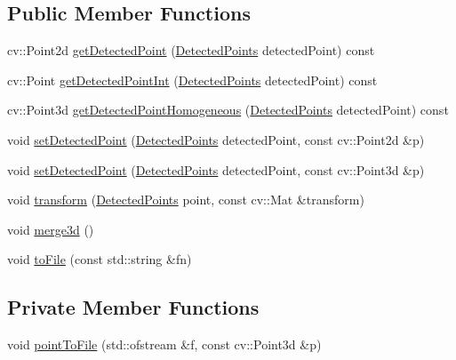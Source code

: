 \subsection*{Public Member Functions}
\begin{DoxyCompactItemize}
\item 
cv\+::\+Point2d \hyperlink{class_face3_d_1_1_face_geometry_a9ce57cf061663a02267d9fee423dbc73}{get\+Detected\+Point} (\hyperlink{class_face3_d_1_1_face_geometry_aab597f00966010882927a4974649bf11}{Detected\+Points} detected\+Point) const 
\item 
cv\+::\+Point \hyperlink{class_face3_d_1_1_face_geometry_a3c4e46361330951648193f24b8a5329d}{get\+Detected\+Point\+Int} (\hyperlink{class_face3_d_1_1_face_geometry_aab597f00966010882927a4974649bf11}{Detected\+Points} detected\+Point) const 
\item 
cv\+::\+Point3d \hyperlink{class_face3_d_1_1_face_geometry_a6aed421ae667cc1b67b4bf6a891ff634}{get\+Detected\+Point\+Homogeneous} (\hyperlink{class_face3_d_1_1_face_geometry_aab597f00966010882927a4974649bf11}{Detected\+Points} detected\+Point) const 
\item 
void \hyperlink{class_face3_d_1_1_face_geometry_a0cbcfd1b63284e1d1fa1f91a87b8f06a}{set\+Detected\+Point} (\hyperlink{class_face3_d_1_1_face_geometry_aab597f00966010882927a4974649bf11}{Detected\+Points} detected\+Point, const cv\+::\+Point2d \&p)
\item 
void \hyperlink{class_face3_d_1_1_face_geometry_a737543f3299fee8c845f2af2e25355e1}{set\+Detected\+Point} (\hyperlink{class_face3_d_1_1_face_geometry_aab597f00966010882927a4974649bf11}{Detected\+Points} detected\+Point, const cv\+::\+Point3d \&p)
\item 
void \hyperlink{class_face3_d_1_1_face_geometry_a876baec2ea039287ec5d45784d9b0242}{transform} (\hyperlink{class_face3_d_1_1_face_geometry_aab597f00966010882927a4974649bf11}{Detected\+Points} point, const cv\+::\+Mat \&transform)
\item 
void \hyperlink{class_face3_d_1_1_face_geometry_a653c167dc85c8eb861fa8fba73ecfd72}{merge3d} ()
\item 
void \hyperlink{class_face3_d_1_1_face_geometry_a7ff82baf7bb2a3f2ddc883a34e9ca945}{to\+File} (const std\+::string \&fn)
\end{DoxyCompactItemize}
\subsection*{Private Member Functions}
\begin{DoxyCompactItemize}
\item 
void \hyperlink{class_face3_d_1_1_face_geometry_adfb84290b1363a7f37c785640464bc42}{point\+To\+File} (std\+::ofstream \&f, const cv\+::\+Point3d \&p)
\end{DoxyCompactItemize}
